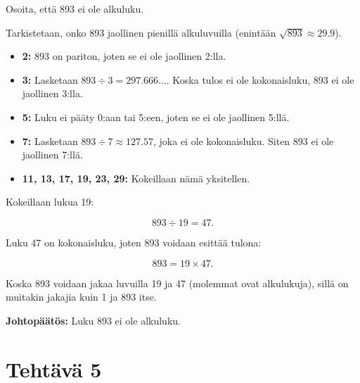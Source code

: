 \documentclass{article}
\begin{document}
Osoita, että 893 ei ole alkuluku.

\begin{flushleft}
Tarkistetaan, onko 893 jaollinen pienillä alkuluvuilla (enintään \( \sqrt{893} \approx 29.9 \)).
\end{flushleft}

\begin{itemize}
	\item \textbf{2:} 893 on pariton, joten se ei ole jaollinen 2:lla.
	\item \textbf{3:} Lasketaan \(893 \div 3 = 297.666\ldots\). Koska tulos ei ole kokonaisluku, 893 ei ole jaollinen 3:lla.
	\item \textbf{5:} Luku ei pääty 0:aan tai 5:een, joten se ei ole jaollinen 5:llä.
	\item \textbf{7:} Lasketaan \(893 \div 7 \approx 127.57\), joka ei ole kokonaisluku. Siten 893 ei ole jaollinen 7:llä.
	\item \textbf{11, 13, 17, 19, 23, 29:} Kokeillaan nämä yksitellen.
\end{itemize}

\begin{flushleft}
Kokeillaan lukua 19:
\end{flushleft}
\[
893 \div 19 = 47.
\]

\begin{flushleft}
Luku 47 on kokonaisluku, joten 893 voidaan esittää tulona:
\end{flushleft}
\[
893 = 19 \times 47.
\]

\begin{flushleft}
Koska 893 voidaan jakaa luvuilla 19 ja 47 (molemmat ovat alkulukuja), sillä on muitakin jakajia kuin 1 ja 893 itse.
\end{flushleft}

\begin{flushleft}
\textbf{Johtopäätös:} Luku 893 ei ole alkuluku.
\end{flushleft}


\newpage

\section*{Tehtävä 5}
\end{document}
